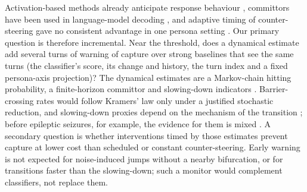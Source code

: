 Activation-based methods already anticipate response behaviour \cite{ashok2025behavior,chen2025persona,lu2026assistant},
committors have been used in language-model decoding \cite{zhou2026commitment}, and adaptive timing of
counter-steering gave no consistent advantage in one persona setting \cite{leins2026drift}. Our primary question is
therefore incremental. Near the threshold, does a dynamical estimate add several turns of warning of capture over
strong baselines that see the same turns (the classifier's score, its change and history, the turn index and a fixed
persona-axis projection)? The dynamical estimates are a Markov-chain hitting probability, a finite-horizon committor
\cite{e2006transition,e2010transition} and slowing-down indicators \cite{scheffer2009early}. Barrier-crossing rates
would follow Kramers' law \cite{kramers1940brownian} only under a justified stochastic reduction, and slowing-down
proxies depend on the mechanism of the transition \cite{ditlevsen2010tipping}; before epileptic seizures, for
example, the evidence for them is mixed \cite{maturana2020slowing,hagemann2021criticality}. A secondary question
is whether interventions timed by those estimates prevent capture at lower cost than scheduled or constant
counter-steering. Early warning is not expected for noise-induced jumps without a nearby bifurcation, or for
transitions faster than the slowing-down; such a monitor would complement classifiers, not replace them.

